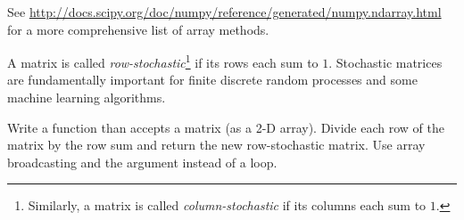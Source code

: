 See \url{http://docs.scipy.org/doc/numpy/reference/generated/numpy.ndarray.html} for a more comprehensive list of array methods.

\begin{problem} %
A matrix is called \emph{row-stochastic}\footnote{Similarly, a matrix is called \emph{column-stochastic} if its columns each sum to $1$.} if its rows each sum to $1$.
Stochastic matrices are fundamentally important for finite discrete random processes and some machine learning algorithms.

Write a function than accepts a matrix (as a 2-D array).
Divide each row of the matrix by the row sum and return the new row-stochastic matrix.
Use array broadcasting and the  argument instead of a loop.
\end{problem}

